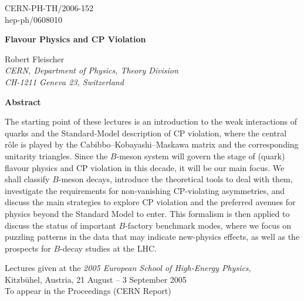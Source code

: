 \documentclass[12pt]{article}
\date{1 Aug 2006}
\begin{document}


\thispagestyle{empty}

\begin{flushright}
CERN-PH-TH/2006-152\\
hep-ph/0608010
\end{flushright}

\vspace{1.6truecm}
\begin{center}
\boldmath
\large\bf  Flavour Physics and CP Violation
\unboldmath
\end{center}

\vspace{0.9truecm}
\begin{center}
Robert Fleischer\\[0.1cm]
{\sl CERN, Department of Physics, Theory Division\\
CH-1211 Geneva 23, Switzerland}
\end{center}

\vspace{1.3truecm}

\begin{center}
{\bf Abstract}
\end{center}

{\small
\vspace{0.2cm}\noindent
The starting point of these lectures is an introduction to the weak 
interactions of quarks and the Standard-Model description of CP violation, 
where the central r\^ole is played by the Cabibbo--Kobayashi--Maskawa matrix 
and the corresponding unitarity triangles. Since the $B$-meson system will govern 
the stage of (quark) flavour physics and CP violation in this decade, 
it will be our main focus. We  shall classify $B$-meson decays, introduce the 
theoretical tools to deal with them, investigate the requirements for non-vanishing 
CP-violating asymmetries, and discuss the main strategies to explore
CP violation and the preferred avenues for physics beyond the Standard Model
to enter. This formalism is then applied to discuss the status of important 
$B$-factory benchmark modes, where we focus on puzzling patterns in the
data that may indicate new-physics effects, as well as the prospects for 
$B$-decay studies at the LHC.
}

\vspace{1.5truecm}

\begin{center}
Lectures given at the {\it 2005 European School of High-Energy Physics,}\\
Kitzb\"uhel, Austria, 21 August -- 3 September 2005\\
To appear in the Proceedings (CERN Report)
\end{center}
\end{document}
